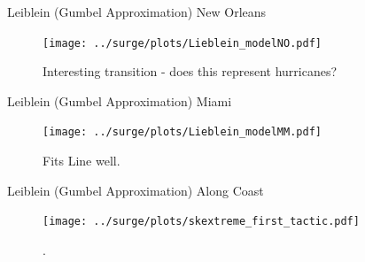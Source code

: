 
\begin{frame}{Leiblein (Gumbel Approximation) New Orleans}
\vspace{-20pt}
 \begin{minipage}{1.0\textwidth}
\begin{figure}[htb!]
    \centering
    \texttt{[image: ../surge/plots/Lieblein\_modelNO.pdf]}
    \vspace{-15pt}
   \caption{Interesting transition - does this represent hurricanes? }
    \label{fig:}
\end{figure}
\end{minipage}
\end{frame}


\begin{frame}{Leiblein (Gumbel Approximation) Miami}
\vspace{-20pt}
 \begin{minipage}{1.0\textwidth}
\begin{figure}[htb!]
    \centering
    \texttt{[image: ../surge/plots/Lieblein\_modelMM.pdf]}
    \vspace{-15pt}
   \caption{Fits Line well. }
    \label{fig:}
\end{figure}
\end{minipage}
\end{frame}


\begin{frame}{Leiblein (Gumbel Approximation) Along Coast}
\vspace{-20pt}
 \begin{minipage}{1.0\textwidth}
\begin{figure}[htb!]
    \centering
    \texttt{[image: ../surge/plots/skextreme\_first\_tactic.pdf]}
    \vspace{-15pt}
   \caption{. }
    \label{fig:}
\end{figure}
\end{minipage}
\end{frame}





